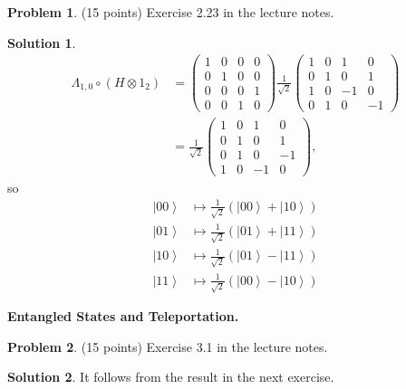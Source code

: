 \documentclass{article}
\theoremstyle{definition}
\newtheorem{problem}{Problem}
\newtheorem*{solution}{Solution}
\begin{document}
\begin{problem} (15 points)
Exercise 2.23 in the lecture notes.
\end{problem}
\begin{solution}
\begin{align*}
\Lambda_{1,0} \circ (H \otimes 1_2) & = 
\begin{pmatrix}
1 & 0 & 0 & 0 \\
0 & 1 & 0 & 0 \\
0 & 0 & 0 & 1 \\
0 & 0 & 1 & 0
\end{pmatrix}
\frac{1}{\sqrt 2}
\begin{pmatrix}
1 & 0 & 1 & 0 \\
0 & 1 & 0 & 1 \\
1 & 0 & -1 & 0 \\
0 & 1 & 0 & -1 
\end{pmatrix}
\\
& = \frac{1}{\sqrt 2} 
\begin{pmatrix}
1 & 0 & 1 & 0 \\
0 & 1 & 0 & 1 \\
0 & 1 & 0 & -1 \\
1 & 0 & -1 & 0
\end{pmatrix},
\end{align*}
so 
\begin{align*}
 \left| 00 \right\rangle & \mapsto \frac{1}{\sqrt 2} \left( \left| 00 \right\rangle +  \left| 10 \right\rangle \right)  \\
 \left| 01 \right\rangle & \mapsto \frac{1}{\sqrt 2} \left( \left| 01 \right\rangle +  \left| 11 \right\rangle \right)  \\
 \left| 10 \right\rangle & \mapsto \frac{1}{\sqrt 2} \left( \left| 01 \right\rangle -  \left| 11 \right\rangle \right)  \\
 \left| 11 \right\rangle & \mapsto \frac{1}{\sqrt 2} \left( \left| 00 \right\rangle -  \left| 10 \right\rangle \right)  
\end{align*}
\end{solution}


\noindent\textbf{Entangled States and Teleportation.} 
\begin{problem} (15 points)
Exercise 3.1 in the lecture notes.
\end{problem}
\begin{solution}
It follows from the result in the next exercise.
\end{solution}
\end{document}
